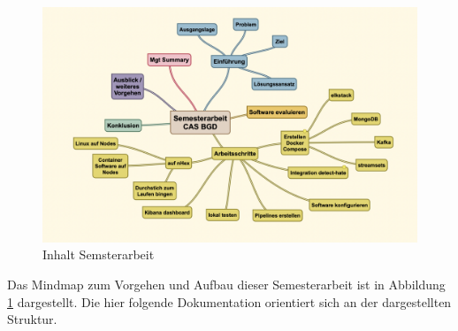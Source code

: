                                                                                                                                                                                                                                                                                                                                                                                                                                                                                                                                                                                                                                                                                                                                                                                                                                                                        

\begin{figure}[H]
	\centering
		\includegraphics[scale=0.4 ]{images/inhalt_arbeit.png}
	\caption{Inhalt Semsterarbeit}
	\label{fig:inhalt_semesterarbeit}
\end{figure}

Das Mindmap zum Vorgehen und Aufbau dieser Semesterarbeit ist in Abbildung \ref{fig:inhalt_semesterarbeit} dargestellt. Die hier folgende Dokumentation orientiert sich an der dargestellten Struktur. 

